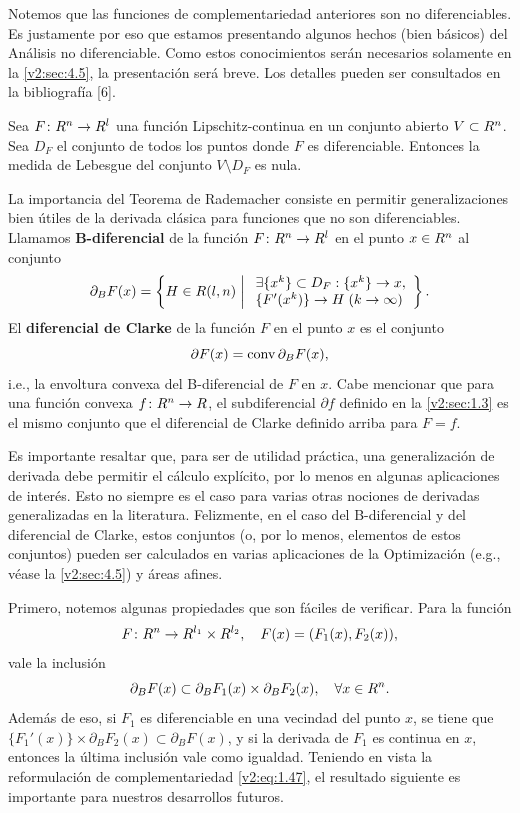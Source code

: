 Notemos que las funciones de complementariedad anteriores son no diferenciables. Es justamente por eso que estamos presentando algunos hechos (bien básicos) del Análisis no diferenciable. Como estos conocimientos serán necesarios solamente en la \cref{v2:sec:4.5}, la presentación será breve. Los detalles pueden ser consultados en la bibliografía [6].

\begin{theorem}\label{v2:thm:1.6.1}
    Sea $F \colon R^n \to R^l$ una función Lipschitz-continua en un conjunto abierto $V \subset R^n$. Sea $D_F$ el conjunto de todos los puntos donde $F$ es diferenciable.
    Entonces la medida de Lebesgue del conjunto $V \setminus D_F$ es nula.
\end{theorem}

La importancia del Teorema de Rademacher consiste en permitir generalizaciones bien útiles de la derivada clásica para funciones que no son diferenciables.
Llamamos \textbf{B-diferencial} de la función $F \colon R^n \to R^l$ en el punto $x \in R^n$ al conjunto
\[
    \partial_B F(x) = \left\{ H \in R(l, n) \mathrel{\bigg|} \begin{array}{l} \exists \{x^k\} \subset D_F : \{x^k\} \to x, \\ \{F'(x^k)\} \to H \; (k \to \infty) \end{array} \right\}.
\]
El \textbf{diferencial de Clarke} de la función $F$ en el punto $x$ es el conjunto
\[
    \partial F(x) = \operatorname{conv} \partial_B F(x),
\]
i.e., la envoltura convexa del B-diferencial de $F$ en $x$. Cabe mencionar que para una función convexa $f \colon R^n \to R$, el subdiferencial $\partial f$ definido en la \cref{v2:sec:1.3} es el mismo conjunto que el diferencial de Clarke definido arriba para $F = f$.

Es importante resaltar que, para ser de utilidad práctica, una generalización de derivada debe permitir el cálculo explícito, por lo menos en algunas aplicaciones de interés. Esto no siempre es el caso para varias otras nociones de derivadas generalizadas en la literatura. Felizmente, en el caso del B-diferencial y del diferencial de Clarke, estos conjuntos (o, por lo menos, elementos de estos conjuntos) pueden ser calculados en varias aplicaciones de la Optimización (e.g., véase la \cref{v2:sec:4.5}) y áreas afines.

Primero, notemos algunas propiedades que son fáciles de verificar. Para la función
\[
    F \colon R^n \to R^{l_1} \times R^{l_2}, \quad F(x) = (F_1(x), F_2(x)),
\]
vale la inclusión
\[
    \partial_B F(x) \subset \partial_B F_1(x) \times \partial_B F_2(x), \quad \forall x \in R^n.
\]
Además de eso, si $F_1$ es diferenciable en una vecindad del punto $x$, se tiene que $\{F_1'(x)\} \times \partial_B F_2(x) \subset \partial_B F(x)$, y si la derivada de $F_1$ es continua en $x$, entonces la última inclusión vale como igualdad.
Teniendo en vista la reformulación de complementariedad \eqref{v2:eq:1.47}, el resultado siguiente es importante para nuestros desarrollos futuros.

